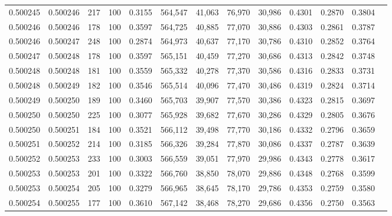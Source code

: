 \begin{tabular}{rrrrrrrrrrrrr}
0.500245 & 0.500246 &   217 & 100 &                                     0.3155 & 564,547 &  41,063 &  76,970 &  30,986 & 0.4301 & 0.2870 & 0.3804 \\
0.500246 & 0.500246 &   178 & 100 &                                     0.3597 & 564,725 &  40,885 &  77,070 &  30,886 & 0.4303 & 0.2861 & 0.3787 \\
0.500246 & 0.500247 &   248 & 100 &                                     0.2874 & 564,973 &  40,637 &  77,170 &  30,786 & 0.4310 & 0.2852 & 0.3764 \\
0.500247 & 0.500248 &   178 & 100 &                                     0.3597 & 565,151 &  40,459 &  77,270 &  30,686 & 0.4313 & 0.2842 & 0.3748 \\
0.500248 & 0.500248 &   181 & 100 &                                     0.3559 & 565,332 &  40,278 &  77,370 &  30,586 & 0.4316 & 0.2833 & 0.3731 \\
0.500248 & 0.500249 &   182 & 100 &                                     0.3546 & 565,514 &  40,096 &  77,470 &  30,486 & 0.4319 & 0.2824 & 0.3714 \\
0.500249 & 0.500250 &   189 & 100 &                                     0.3460 & 565,703 &  39,907 &  77,570 &  30,386 & 0.4323 & 0.2815 & 0.3697 \\
0.500250 & 0.500250 &   225 & 100 &                                     0.3077 & 565,928 &  39,682 &  77,670 &  30,286 & 0.4329 & 0.2805 & 0.3676 \\
0.500250 & 0.500251 &   184 & 100 &                                     0.3521 & 566,112 &  39,498 &  77,770 &  30,186 & 0.4332 & 0.2796 & 0.3659 \\
0.500251 & 0.500252 &   214 & 100 &                                     0.3185 & 566,326 &  39,284 &  77,870 &  30,086 & 0.4337 & 0.2787 & 0.3639 \\
0.500252 & 0.500253 &   233 & 100 &                                     0.3003 & 566,559 &  39,051 &  77,970 &  29,986 & 0.4343 & 0.2778 & 0.3617 \\
0.500253 & 0.500253 &   201 & 100 &                                     0.3322 & 566,760 &  38,850 &  78,070 &  29,886 & 0.4348 & 0.2768 & 0.3599 \\
0.500253 & 0.500254 &   205 & 100 &                                     0.3279 & 566,965 &  38,645 &  78,170 &  29,786 & 0.4353 & 0.2759 & 0.3580 \\
0.500254 & 0.500255 &   177 & 100 &                                     0.3610 & 567,142 &  38,468 &  78,270 &  29,686 & 0.4356 & 0.2750 & 0.3563 \\

\end{tabular}
